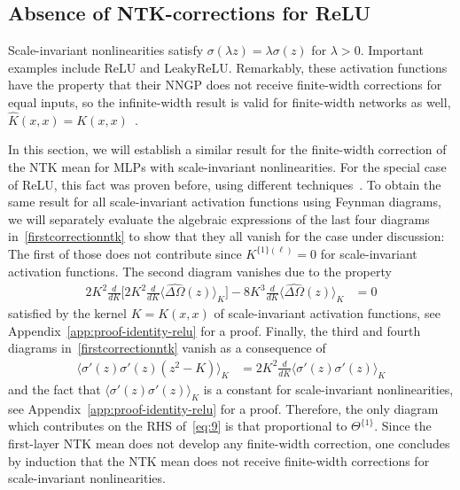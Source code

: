 \subsection{Absence of NTK-corrections for ReLU}\label{absence-NTK-corrections-ReLU}
Scale-invariant nonlinearities satisfy $\sigma(\lambda z)=\lambda\sigma(z)$ for $\lambda>0$. Important examples include ReLU and LeakyReLU. Remarkably, these activation functions have the property that their NNGP does not receive finite-width corrections for equal inputs, so the infinite-width result is valid for finite-width networks as well, $\widehat K(x,x)=K(x,x)$~\cite{roberts2022}.

In this section, we will establish a similar result for the finite-width correction of the NTK mean for MLPs with scale-invariant nonlinearities. For the special case of ReLU, this fact was proven before, using different techniques~\cite{hanin2019,seleznova2022}. To obtain the same result for all scale-invariant activation functions using Feynman diagrams, we will separately evaluate the algebraic expressions of the last four diagrams in~\eqref{firstcorrectionntk} to show that they all vanish for the case under discussion: The first of those does not contribute since $K^{\{1\}(\ell)}=0$ for scale-invariant activation functions. The second diagram vanishes due to the property
\begin{align}
    2K^{2}\frac{d}{dK}\bigg[2K^{2}\frac{d}{dK}\langle \widehat{\Delta \Omega}(z)\rangle_{K}\bigg] - 8K^{3}\frac{d}{dK}\langle \widehat{\Delta \Omega}(z)\rangle_{K} &= 0\label{eq:11}
\end{align}
satisfied by the kernel $K=K(x,x)$ of scale-invariant activation functions, see Appendix~\ref{app:proof-identity-relu} for a proof. Finally, the third and fourth diagrams in~\eqref{firstcorrectionntk} vanish as a consequence of
\begin{align}
\langle \sigma'(z) \sigma'(z) (z^{2} - K)\rangle_{K} &=2K^{2} \frac{d}{dK}\langle \sigma'(z) \sigma'(z)\rangle_{K}\label{eq:9}
\end{align}
and the fact that $\langle \sigma'(z) \sigma'(z)\rangle_{K}$ is a constant for scale-invariant nonlinearities, see Appendix~\ref{app:proof-identity-relu} for a proof. Therefore, the only diagram which contributes on the RHS of~\eqref{eq:9} is that proportional to $\Theta^{\{1\}}$. Since the first-layer NTK mean does not develop any finite-width correction, one concludes by induction that the NTK mean does not receive finite-width corrections for scale-invariant nonlinearities.
 

